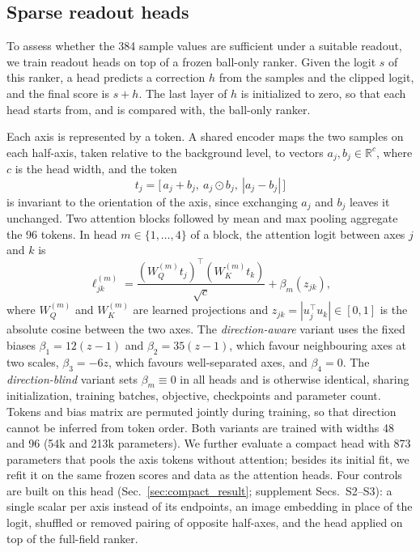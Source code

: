 \subsection{Sparse readout heads}
\label{sec:sparse_method}

To assess whether the 384 sample values are sufficient under a suitable readout, we train readout heads on top of a frozen ball-only ranker. Given the logit $s$ of this ranker, a head predicts a correction $h$ from the samples and the clipped logit, and the final score is $s+h$. The last layer of $h$ is initialized to zero, so that each head starts from, and is compared with, the ball-only ranker.

Each axis is represented by a token. A shared encoder maps the two samples on each half-axis, taken relative to the background level, to vectors $a_j,b_j\in\mathbb{R}^c$, where $c$ is the head width, and the token
\begin{equation}
 t_j=\big[\,a_j+b_j,\ a_j\odot b_j,\ |a_j-b_j|\,\big]
 \label{eq:token}
\end{equation}
is invariant to the orientation of the axis, since exchanging $a_j$ and $b_j$ leaves it unchanged. Two attention blocks followed by mean and max pooling aggregate the 96 tokens. In head $m\in\{1,\dots,4\}$ of a block, the attention logit between axes $j$ and $k$ is
\begin{equation}
 \ell^{(m)}_{jk}=\frac{(W^{(m)}_Q t_j)^{\top}(W^{(m)}_K t_k)}{\sqrt{c}}+\beta_m(z_{jk}),
 \label{eq:attention}
\end{equation}
where $W^{(m)}_Q$ and $W^{(m)}_K$ are learned projections and $z_{jk}=|u_j^\top u_k|\in[0,1]$ is the absolute cosine between the two axes. The \emph{direction-aware} variant uses the fixed biases $\beta_1=12(z-1)$ and $\beta_2=35(z-1)$, which favour neighbouring axes at two scales, $\beta_3=-6z$, which favours well-separated axes, and $\beta_4=0$. The \emph{direction-blind} variant sets $\beta_m\equiv0$ in all heads and is otherwise identical, sharing initialization, training batches, objective, checkpoints and parameter count. Tokens and bias matrix are permuted jointly during training, so that direction cannot be inferred from token order. Both variants are trained with widths 48 and 96 (54k and 213k parameters). We further evaluate a compact head with 873 parameters that pools the axis tokens without attention; besides its initial fit, we refit it on the same frozen scores and data as the attention heads. Four controls are built on this head (Sec.~\ref{sec:compact_result}; supplement Secs.~S2--S3): a single scalar per axis instead of its endpoints, an image embedding in place of the logit, shuffled or removed pairing of opposite half-axes, and the head applied on top of the full-field ranker.

